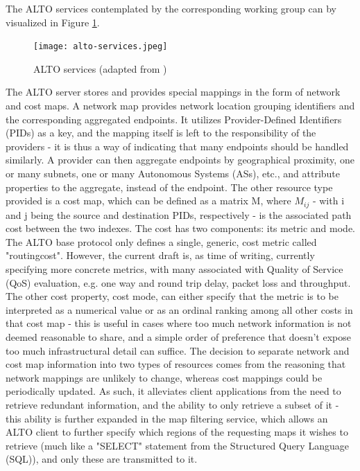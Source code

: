 \documentclass[
  oneside,
  11pt, a4paper,
  footinclude=true,
  headinclude=true,
  cleardoublepage=empty
]{scrbook}
\begin{document}
    \newpage
    
    The ALTO services contemplated by the corresponding working group can by visualized in Figure \ref{fig:alto-services}. 
        
    \begin{figure}[!h]
    \centering
    \texttt{[image: alto-services.jpeg]}
    \caption{ALTO services (adapted from \cite{alto-protocol}) }
    \label{fig:alto-services}
    \end{figure} 
    
    The ALTO server stores and provides special mappings in the form of network and cost maps. A network map provides network location grouping identifiers and the corresponding aggregated endpoints. It utilizes Provider-Defined Identifiers (PIDs) as a key, and the mapping itself is left to the responsibility of the providers - it is thus a way of indicating that many endpoints should be handled similarly. A provider can then aggregate endpoints by geographical proximity, one or many subnets, one or many Autonomous Systems (ASs), etc., and attribute properties to the aggregate, instead of the endpoint. The other resource type provided is a cost map, which can be defined as a matrix M, where $M_{ij}$ - with i and j being the source and destination PIDs, respectively - is the associated path cost between the two indexes. The cost has two components: its metric and mode. The ALTO base protocol only defines a single, generic, cost metric called "routingcost". However, the current draft \cite{alto-metrics} is, as time of writing, currently specifying more concrete metrics, with many associated with Quality of Service (QoS) evaluation, e.g. one way and round trip delay, packet loss and throughput. The other cost property, cost mode, can either specify that the metric is to be interpreted as a numerical value or as an ordinal ranking among all other costs in that cost map - this is useful in cases where too much network information is not deemed reasonable to share, and a simple order of preference that doesn't expose too much infrastructural detail can suffice. The decision to separate network and cost map information into two types of resources comes from the reasoning that network mappings are unlikely to change, whereas cost mappings could be periodically updated. As such, it alleviates client applications from the need to retrieve redundant information, and the ability to only retrieve a subset of it - this ability is further expanded in the map filtering service, which allows an ALTO client to further specify which regions of the requesting maps it wishes to retrieve (much like a "SELECT" statement from the Structured Query Language (SQL)), and only these are transmitted to it.
    
\end{document}
